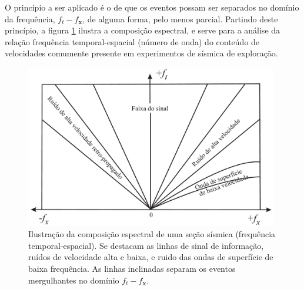 O princípio a ser aplicado é o de que os eventos possam ser separados no domínio da frequência, $f_{t}-f_{\mathbf{x}}$, de alguma forma, pelo menos parcial.  
Partindo deste princípio, a figura \ref{fig:Analise_Idealizada_Sinal_Ruido_Frequencia} ilustra a composição espectral, e serve para a análise da relação frequência temporal-espacial (número de onda) do conteúdo de velocidades comumente presente em experimentos de sísmica de exploração.

\begin{figure}[H]
\centering
\includegraphics[width=11cm]{figuras/cap2/Analise_Idealizada_Sinal_Ruido_Frequencia.pdf}
\vspace{-0.3cm}
\caption{Ilustração da composição espectral de uma seção sísmica (frequência temporal-espacial). 
Se destacam as linhas de sinal de informação, ruídos de velocidade alta e baixa, e ruido das ondas de superfície de baixa frequência. As linhas inclinadas separam os eventos mergulhantes no domínio $f_{t}-f_{\mathbf{x}}$.}
\label{fig:Analise_Idealizada_Sinal_Ruido_Frequencia}
\end{figure}

